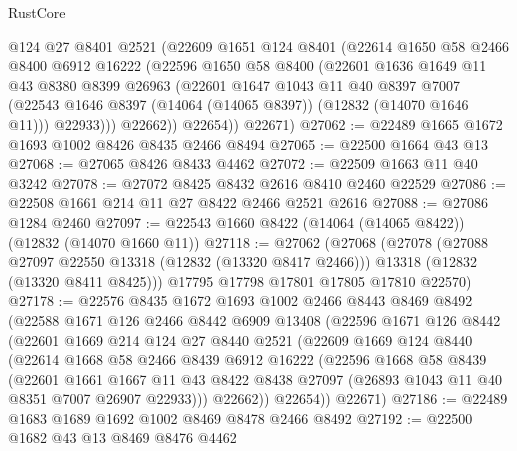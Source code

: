 \begin{lexlean}{RustCore}
\begin{coremodule}
          @124
          @27
          @8401
          @2521
          (@22609
            @1651
            @124
            @8401
            (@22614
              @1650
              @58
              @2466
              @8400
              @6912
              @16222
              (@22596
                @1650
                @58
                @8400
                (@22601
                  @1636
                  @1649
                  @11
                  @43
                  @8380
                  @8399
                  @26963
                  (@22601
                    @1647
                    @1043
                    @11
                    @40
                    @8397
                    @7007
                    (@22543 @1646 @8397 (@14064 (@14065 @8397)) (@12832 (@14070 @1646 @11)))
                    @22933)))
              @22662))
          @22654))
      @22671)
@27062 := @22489 @1665 @1672 @1693 @1002 @8426 @8435 @2466 @8494
@27065 := @22500 @1664 @43 @13
@27068 := @27065 @8426 @8433 @4462
@27072 := @22509 @1663 @11 @40 @3242
@27078 := @27072 @8425 @8432 @2616 @8410 @2460 @22529
@27086 := @22508 @1661 @214 @11 @27 @8422 @2466 @2521 @2616
@27088 := @27086 @1284 @2460
@27097 := @22543 @1660 @8422 (@14064 (@14065 @8422)) (@12832 (@14070 @1660 @11))
@27118 := @27062
    (@27068
      (@27078
        (@27088 @27097 @22550 @13318 (@12832 (@13320 @8417 @2466)))
        @13318
        (@12832 (@13320 @8411 @8425)))
      @17795
      @17798
      @17801
      @17805
      @17810
      @22570)
@27178 := @22576
    @8435
    @1672
    @1693
    @1002
    @2466
    @8443
    @8469
    @8492
    (@22588
      @1671
      @126
      @2466
      @8442
      @6909
      @13408
      (@22596
        @1671
        @126
        @8442
        (@22601
          @1669
          @214
          @124
          @27
          @8440
          @2521
          (@22609
            @1669
            @124
            @8440
            (@22614
              @1668
              @58
              @2466
              @8439
              @6912
              @16222
              (@22596
                @1668
                @58
                @8439
                (@22601
                  @1661
                  @1667
                  @11
                  @43
                  @8422
                  @8438
                  @27097
                  (@26893 @1043 @11 @40 @8351 @7007 @26907 @22933)))
              @22662))
          @22654))
      @22671)
@27186 := @22489 @1683 @1689 @1692 @1002 @8469 @8478 @2466 @8492
@27192 := @22500 @1682 @43 @13 @8469 @8476 @4462

\end{coremodule}
\end{lexlean}
